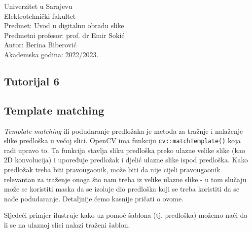 \documentclass[a4paper, 12pt]{article}
\begin{document}
\noindent
Univerzitet u Sarajevu\\
Elektrotehnički fakultet\\
Predmet: Uvod u digitalnu obradu slike\\
Predmetni profesor: prof. dr Emir Sokić\\
Autor: Berina Biberović\\
Akademska godina: 2022/2023.


\begin{center}
    \section*{Tutorijal 6}
    \subsection*{Template matching}
\end{center}

\textit{Template matching} ili podudaranje predložaka je metoda za tražnje i nalaženje slike predloška u većoj slici. OpenCV ima funkciju \lstinline{cv::matchTemplate()} koja radi upravo to. Ta funkcija stavlja sliku predloška preko ulazne velike slike (kao 2D konvolucija) i upoređuje predložak i djelić ulazne slike ispod predloška. Kako predložak treba biti pravougaonik, može biti da nije cijeli pravougaonik relevantan za traženje onoga što nam treba iz velike ulazne slike - u tom slučaju može se koristiti maska da se izoluje dio predloška koji se treba koristiti da se nađe podudaranje. Detaljnije ćemo kasnije pričati o ovome.

Sljedeći primjer ilustruje kako uz pomoć šablona (tj. predloška) možemo naći da li se na ulaznoj slici nalazi traženi šablon.
\end{document}
